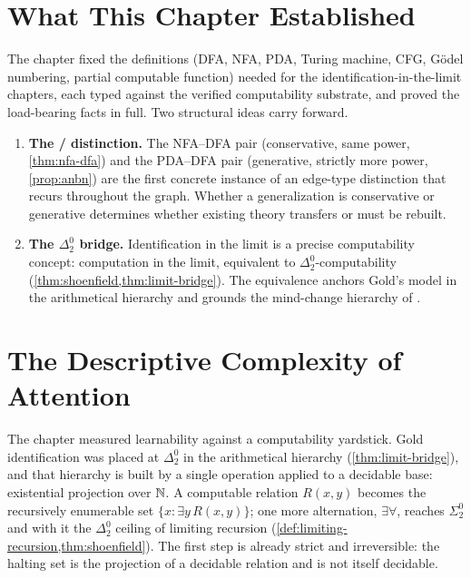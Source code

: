 \section{What This Chapter Established}
\label{sec:ch3-summary}

The chapter fixed the definitions (DFA, NFA, PDA, Turing machine, CFG, G\"odel numbering, partial computable function) needed for the identification-in-the-limit chapters, each typed against the verified computability substrate, and proved the load-bearing facts in full. Two structural ideas carry forward.

\begin{enumerate}[leftmargin=*,itemsep=3pt]
\item \textbf{The / distinction.} The NFA--DFA pair (conservative, same power, \cref{thm:nfa-dfa}) and the PDA--DFA pair (generative, strictly more power, \cref{prop:anbn}) are the first concrete instance of an edge-type distinction that recurs throughout the graph. Whether a generalization is conservative or generative determines whether existing theory transfers or must be rebuilt.

\item \textbf{The $\Delta^0_2$ bridge.} Identification in the limit is a precise computability concept: computation in the limit, equivalent to $\Delta^0_2$-computability (\cref{thm:shoenfield,thm:limit-bridge}). The equivalence anchors Gold's model in the arithmetical hierarchy and grounds the mind-change hierarchy of .
\end{enumerate}


\section{The Descriptive Complexity of Attention}
\label{sec:ch3-transformer}

The chapter measured learnability against a computability yardstick. Gold identification was placed at $\Delta^0_2$ in the arithmetical hierarchy (\cref{thm:limit-bridge}), and that hierarchy is built by a single operation applied to a decidable base: existential projection over $\mathbb{N}$. A computable relation $R(x,y)$ becomes the recursively enumerable set $\{x : \exists y\, R(x,y)\}$; one more alternation, $\exists\forall$, reaches $\Sigma^0_2$ and with it the $\Delta^0_2$ ceiling of limiting recursion (\cref{def:limiting-recursion,thm:shoenfield}). The first step is already strict and irreversible: the halting set is the projection of a decidable relation and is not itself decidable.

